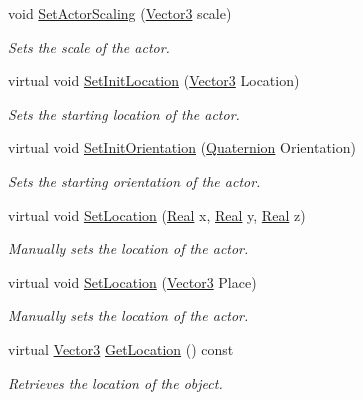 \begin{DoxyCompactItemize}
void \hyperlink{classphys_1_1ActorSoft_ad1696a10b3057897ca503de013aaddc6}{SetActorScaling} (\hyperlink{classphys_1_1Vector3}{Vector3} scale)
\begin{DoxyCompactList}\small\item\em Sets the scale of the actor. \item\end{DoxyCompactList}\item 
virtual void \hyperlink{classphys_1_1ActorSoft_abbb6f5cce15d4efee91acd4825c75801}{SetInitLocation} (\hyperlink{classphys_1_1Vector3}{Vector3} Location)
\begin{DoxyCompactList}\small\item\em Sets the starting location of the actor. \item\end{DoxyCompactList}\item 
virtual void \hyperlink{classphys_1_1ActorSoft_adde8ecfb7188b8cbb238e88da18ac95e}{SetInitOrientation} (\hyperlink{classphys_1_1Quaternion}{Quaternion} Orientation)
\begin{DoxyCompactList}\small\item\em Sets the starting orientation of the actor. \item\end{DoxyCompactList}\item 
virtual void \hyperlink{classphys_1_1ActorSoft_a30ca5d4db06d9a81b5aff23faed4ee8d}{SetLocation} (\hyperlink{namespacephys_af7eb897198d265b8e868f45240230d5f}{Real} x, \hyperlink{namespacephys_af7eb897198d265b8e868f45240230d5f}{Real} y, \hyperlink{namespacephys_af7eb897198d265b8e868f45240230d5f}{Real} z)
\begin{DoxyCompactList}\small\item\em Manually sets the location of the actor. \item\end{DoxyCompactList}\item 
virtual void \hyperlink{classphys_1_1ActorSoft_a35020af183a31e288ff226a34fd1a0ab}{SetLocation} (\hyperlink{classphys_1_1Vector3}{Vector3} Place)
\begin{DoxyCompactList}\small\item\em Manually sets the location of the actor. \item\end{DoxyCompactList}\item 
virtual \hyperlink{classphys_1_1Vector3}{Vector3} \hyperlink{classphys_1_1ActorSoft_afdbd6ae49e3838190e5481796e650ce8}{GetLocation} () const 
\begin{DoxyCompactList}\small\item\em Retrieves the location of the object. \item\end{DoxyCompactList}\item 

\end{DoxyCompactItemize}
